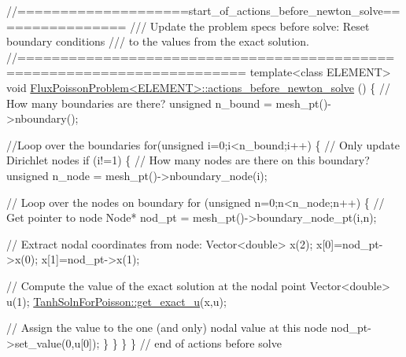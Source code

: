 \begin{DoxyCodeInclude}
\textcolor{comment}{//====================start\_of\_actions\_before\_newton\_solve================}
\textcolor{comment}{/// Update the problem specs before solve: Reset boundary conditions}
\textcolor{comment}{}\textcolor{comment}{/// to the values from the exact solution.}
\textcolor{comment}{}\textcolor{comment}{//========================================================================}
\textcolor{keyword}{template}<\textcolor{keyword}{class} ELEMENT>
\textcolor{keywordtype}{void} \hyperlink{classFluxPoissonProblem_aaea8f7f6f7a2e1aedfd2854e1ae12338}{FluxPoissonProblem<ELEMENT>::actions\_before\_newton\_solve}
      ()
\{
 \textcolor{comment}{// How many boundaries are there?}
 \textcolor{keywordtype}{unsigned} n\_bound = mesh\_pt()->nboundary();
 
 \textcolor{comment}{//Loop over the boundaries}
 \textcolor{keywordflow}{for}(\textcolor{keywordtype}{unsigned} i=0;i<n\_bound;i++)
  \{
   \textcolor{comment}{// Only update Dirichlet nodes}
   \textcolor{keywordflow}{if} (i!=1)
    \{
     \textcolor{comment}{// How many nodes are there on this boundary?}
     \textcolor{keywordtype}{unsigned} n\_node = mesh\_pt()->nboundary\_node(i);
     
     \textcolor{comment}{// Loop over the nodes on boundary}
     \textcolor{keywordflow}{for} (\textcolor{keywordtype}{unsigned} n=0;n<n\_node;n++)
      \{
       \textcolor{comment}{// Get pointer to node}
       Node* nod\_pt = mesh\_pt()->boundary\_node\_pt(i,n);
       
       \textcolor{comment}{// Extract nodal coordinates from node:}
       Vector<double> x(2);
       x[0]=nod\_pt->x(0);
       x[1]=nod\_pt->x(1);
       
       \textcolor{comment}{// Compute the value of the exact solution at the nodal point}
       Vector<double> u(1);
       \hyperlink{namespaceTanhSolnForPoisson_af7896e9c18ce6438c73ae2a875e8b7de}{TanhSolnForPoisson::get\_exact\_u}(x,u);
       
       \textcolor{comment}{// Assign the value to the one (and only) nodal value at this node}
       nod\_pt->set\_value(0,u[0]);
      \}
    \} 
  \}
\} \textcolor{comment}{// end of actions before solve}

\end{DoxyCodeInclude}




 

